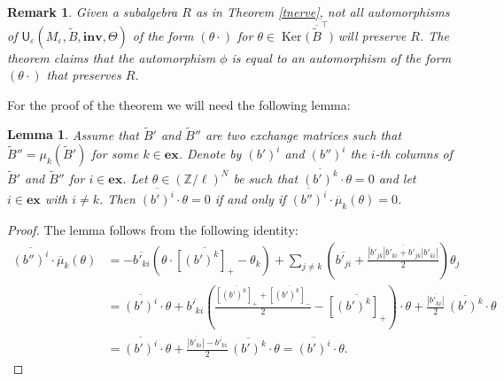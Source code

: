 \documentclass[11pt]{amsart}
\theoremstyle{plain}
\newtheorem{lemma}[theorem]{Lemma}
\newtheorem{remark}[theorem]{Remark}
\newcommand \ble[1] { \begin{lemma}\label{l#1} }
\newcommand \bre[1] { \begin{remark}\label{r#1}\rm }
\newcommand {\ele} { \end{lemma} }
\newcommand {\ere} { \end{remark} }
\newcommand \thref[1]{Theorem \ref{t#1}}
\def \Zset {{\mathbb Z}}
\def \U {{\boldsymbol{\mathsf U}}}
\def \B  {{\widetilde{B}}}
\newcommand \ex {{\mathbf{ex}}}
\newcommand \inv {{\mathbf{inv}}}
\def \ep {\varepsilon}
\def \ol {\overline}
\DeclareMathOperator \Ker { {\mathrm{Ker}} }
\begin{document}
\bre{notall} Given a subalgebra $R$ as in \thref{nerve}, not all automorphisms of $\U_\ep(M_\ep, \B, \inv, \Theta)$ of the form $(\theta \cdot)$ for $\theta \in \Ker \big( \, \ol{\B}^\top \big)$ will preserve $R$. The theorem claims that the automorphism $\phi$ is equal to an automorphism of the form $(\theta \cdot)$ that preserves $R$. 
\ere

For the proof of the theorem we will need the following lemma:
\ble{ind} Assume that $\B'$ and $\B''$ are two exchange matrices such that $\B'' = \mu_k(\B')$ for some $k \in \ex$. Denote by $(b')^i$ and $(b'')^i$ the $i$-th columns of $\B'$ and $\B''$ for $i \in \ex$. 
Let $\theta \in (\Zset/\ell)^N$ be such that 
$\ol{(b')^k}\cdot\theta =0$ and let $i \in \ex$ with $i \neq k$. Then 
$\ol{(b')^i} \cdot \theta=0$ if and only if $\ol{(b'')^i} \cdot \ol{\mu}_k(\theta)=0$.
\ele
\begin{proof} The lemma follows from the following identity:
\begin{align*}
\ol{(b'')^i} \cdot \ol{\mu}_k(\theta)
&= - \ol{b'_{ki}} (\theta \cdot \ol{[(b')^k]_+} - \theta_k)
+ \sum_{j\neq k}\left(\ol{b'_{ji}} + 
\frac{\ol{|b'_{jk}|b'_{ki}+b'_{jk}|b'_{ki}|}}{2}\right)\theta_j \\[6pt]
&= \ol{(b')^i} \cdot \theta + \ol{b'_{ki}}\left(\frac{\ol{[(b')^k]_+} + \ol{[(b')^k]_-}}{2} - \ol{[(b')^k]_+}\right)\cdot\theta + 
\frac{\ol{|b'_{ki}|}}{2}\, \ol{(b')^k}\cdot\theta \\[6pt]
&= \ol{(b')^i} \cdot \theta + \frac{\ol{|b'_{ki}|} - \ol{b'_{ki}}}{2}\,\ol{(b')^k}\cdot\theta 
= \ol{(b')^i} \cdot \theta.
\end{align*}
\end{proof}
\end{document}
